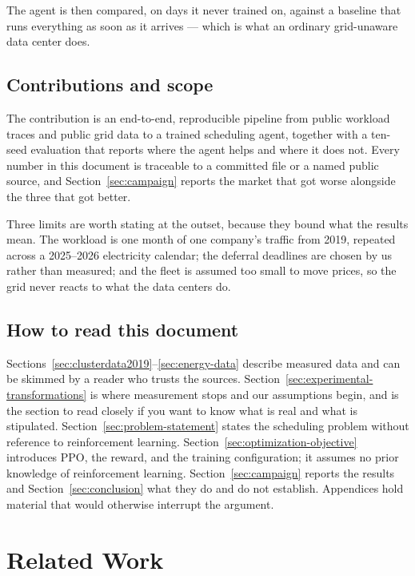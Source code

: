 ﻿\documentclass[12pt]{article}
\begin{document}
The agent is then compared, on days it never trained on, against a baseline
that runs everything as soon as it arrives --- which is what an ordinary
grid-unaware data center does.

\subsection{Contributions and scope}
\label{subsec:intro-scope}

The contribution is an end-to-end, reproducible pipeline from public workload
traces and public grid data to a trained scheduling agent, together with a
ten-seed evaluation that reports where the agent helps and where it does not.
Every number in this document is traceable to a committed file or a named
public source, and Section~\ref{sec:campaign} reports the market that got worse
alongside the three that got better.

Three limits are worth stating at the outset, because they bound what the
results mean. The workload is one month of one company's traffic from 2019,
repeated across a 2025--2026 electricity calendar; the deferral deadlines are
chosen by us rather than measured; and the fleet is assumed too small to move
prices, so the grid never reacts to what the data centers do.

\subsection{How to read this document}
\label{subsec:intro-roadmap}

Sections~\ref{sec:clusterdata2019}--\ref{sec:energy-data} describe measured
data and can be skimmed by a reader who trusts the sources. Section~\ref{sec:experimental-transformations}
is where measurement stops and our assumptions begin, and is the section to
read closely if you want to know what is real and what is stipulated.
Section~\ref{sec:problem-statement} states the scheduling problem without
reference to reinforcement learning. Section~\ref{sec:optimization-objective}
introduces PPO, the reward, and the training configuration; it assumes no prior
knowledge of reinforcement learning. Section~\ref{sec:campaign} reports the
results and Section~\ref{sec:conclusion} what they do and do not establish.
Appendices hold material that would otherwise interrupt the argument.

\section{Related Work}
\label{sec:related-work}
\end{document}

